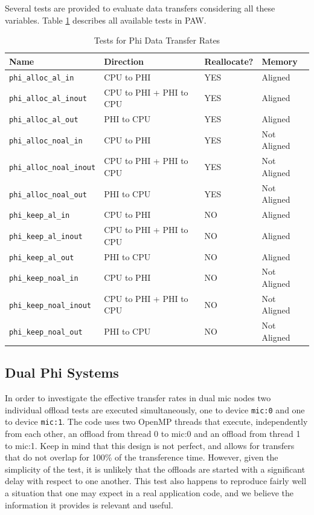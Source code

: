 \documentclass[10pt,a4paper]{report}
\begin{document}
Several tests are provided to evaluate data transfers considering all these variables. Table \ref{tab:phi_bw} describes all available tests in PAW.

\begin{table}[ht]
\centering
\caption{Tests for Phi Data Transfer Rates}
\label{tab:phi_bw}
\begin{tabular}{|l|l|l|l|}
\hline
\bf{Name}	                     & \bf{Direction}          & \bf{Reallocate?} & \bf{Memory}\\\hline
\texttt{phi\_alloc\_al\_in}      & CPU to PHI              & YES & Aligned\\
\texttt{phi\_alloc\_al\_inout}   & CPU to PHI + PHI to CPU & YES & Aligned\\
\texttt{phi\_alloc\_al\_out}     & PHI to CPU              & YES & Aligned\\
\texttt{phi\_alloc\_noal\_in}    & CPU to PHI              & YES & Not Aligned\\
\texttt{phi\_alloc\_noal\_inout} & CPU to PHI + PHI to CPU & YES & Not Aligned\\
\texttt{phi\_alloc\_noal\_out}   & PHI to CPU              & YES & Not Aligned\\
\texttt{phi\_keep\_al\_in}       & CPU to PHI              & NO  & Aligned\\
\texttt{phi\_keep\_al\_inout}    & CPU to PHI + PHI to CPU & NO  & Aligned\\
\texttt{phi\_keep\_al\_out}      & PHI to CPU              & NO  & Aligned\\
\texttt{phi\_keep\_noal\_in}     & CPU to PHI              & NO  & Not Aligned\\
\texttt{phi\_keep\_noal\_inout}  & CPU to PHI + PHI to CPU & NO  & Not Aligned\\
\texttt{phi\_keep\_noal\_out}    & PHI to CPU              & NO  & Not Aligned\\
\hline
\end{tabular}
\end{table}

\FloatBarrier
\subsection{Dual Phi Systems}
In order to investigate the effective transfer rates in dual mic nodes two individual offload tests are executed simultaneously, one to device \verb+mic:0+ and one to device \verb+mic:1+. The code uses two OpenMP threads that execute, independently from each other, an offload from thread 0 to mic:0 and an offload from thread 1 to mic:1. Keep in mind that this design is not perfect, and allows for transfers that do not overlap for 100\% of the transference time. However, given the simplicity of the test, it is unlikely that the offloads are started with a significant delay with respect to one another. This test also happens to  reproduce fairly well a situation that one may expect in a real application code, and we believe the information it provides is relevant and useful. 
\end{document}

